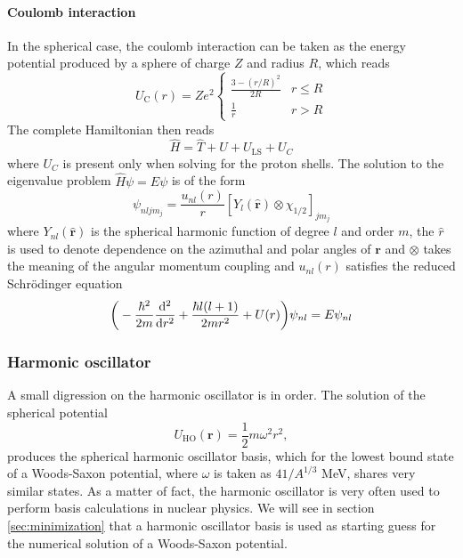 \paragraph{Coulomb interaction}
In the spherical case, the coulomb interaction can be taken as the energy potential produced by a sphere of charge $Z$ and radius $R$, which reads
\begin{equation}
    U_{\text{C}}(r) = Ze^2
    \begin{cases}
        \frac{3-(r/R)^2}{2R} & r \le R \\
        \frac 1 r & r > R
    \end{cases}
\end{equation}
The complete Hamiltonian then reads
\begin{equation}
    \hat H = \hat T + U + U_{\text{LS}}+U_C
\end{equation}
where $U_C$ is present only when solving for the proton shells. The solution to the eigenvalue problem $\hat H \psi = E\psi$ is of the form
\begin{equation}
   \psi_{nljm_j} = \frac{u_{nl}(r)}{r}[Y_{l}(\hat {\bm r})\otimes \chi_{1/2}]_{jm_j} 
\end{equation}
where $Y_{nl}(\hat {\bm r})$ is the spherical harmonic function of degree $l$ and order $m$, the $\hat r$ is used to denote dependence on the azimuthal and polar angles of $\bm r$ and $\otimes$ takes the meaning of the angular momentum coupling and $u_{nl}(r)$ satisfies the reduced Schr\"odinger equation
\begin{equation}
    \label{eq:red}
    \bigg(-\frac {\hbar^2}{2m}\dv[2]{r}+\frac{\hbar l(l+1)}{2mr^2}+U(r)\bigg)\psi_{nl} = E\psi_{nl}
\end{equation}
\subsubsection{Harmonic oscillator}
A small digression on the harmonic oscillator is in order. The solution of the spherical potential 
\begin{equation}
U_{\text{HO}} (\bm r ) = \frac 1 2 m\omega^2 r^ 2,
\end{equation}
produces the spherical harmonic oscillator basis, which for the lowest bound state of a Woods-Saxon potential, where $\omega$ is taken as $41/A^{1/3}$ MeV, shares very similar states. As a matter of fact, the harmonic oscillator is very often used to perform basis calculations in nuclear physics. We will see in section \ref{sec:minimization} that a harmonic oscillator basis is used as starting guess for the numerical solution of a Woods-Saxon potential.
